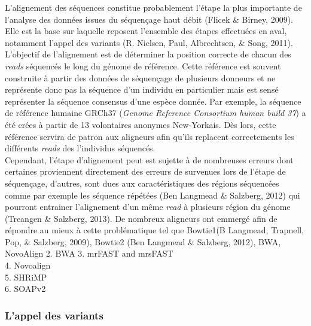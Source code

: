 \documentclass[12pt,twoside]{reedthesis}
\theoremstyle{definition}
\theoremstyle{definition}
\theoremstyle{remark}
\begin{document}
  L'alignement des séquences constitue probablement l'étape la plus
  importante de l'analyse des données issues du séquençage haut débit
  (Flicek \& Birney, 2009). Elle est la base sur laquelle reposent
  l'ensemble des étapes effectuées en aval, notamment l'appel des variants
  (R. Nielsen, Paul, Albrechtsen, \& Song, 2011). L'objectif de
  l'alignement est de déterminer la position correcte de chacun des
  \emph{reads} séquencés le long du génome de référence. Cette référence
  est souvent construite à partir des données de séquençage de plusieurs
  donneurs et ne représente donc pas la séquence d'un individu en
  particulier mais est sensé représenter la séquence consensus d'une
  espèce donnée. Par exemple, la séquence de référence humaine GRCh37
  (\emph{Genome Reference Consortium human build 37}) a été crées à partir
  de 13 volontaires anonymes New-Yorkais. Dès lors, cette référence
  servira de patron aux aligneurs afin qu'ils replacent correctements les
  différents \emph{reads} des l'individus séquencés.\\
  Cependant, l'étape d'alignement peut est sujette à de nombreuses erreurs
  dont certaines proviennent directement des erreurs de survenues lors de
  l'étape de séquençage, d'autres, sont dues aux caractéristiques des
  régions séquencées comme par exemple les séquence répétées (Ben Langmead
  \& Salzberg, 2012) qui pourront entrainer l'alignement d'un même
  \emph{read} à plusieurs région du génome (Treangen \& Salzberg, 2013).
  De nombreux aligneurs ont emmergé afin de répondre au mieux à cette
  problématique tel que Bowtie1(B Langmead, Trapnell, Pop, \& Salzberg,
  2009), Bowtie2 (Ben Langmead \& Salzberg, 2012), BWA, NovoAlign 2. BWA
  3. mrFAST and mrsFAST\\
  4. Novoalign\\
  5. SHRiMP\\
  6. SOAPv2
  
  \subsubsection{L'appel des variants}\label{lappel-des-variants}
  
\end{document}
